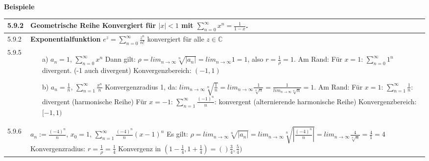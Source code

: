     \noindent
    \textbf{Beispiele}
    \begin{table}[H]
    \begin{tabularx}{\textwidth}{X m{16cm}}
        \toprule

        5.9.2 & \textbf{Geometrische Reihe} \hfill \break 
                Konvergiert für $|x| < 1$ mit $\sum^{\infty}_{n=0} x^n = \frac{1}{1-x}$. \\
        \midrule
        5.9.2 & \textbf{Exponentialfunktion} \hfill \break
                $e^z = \sum^{\infty}_{n=0} \frac{z^n}{n!}$ konvergiert für alle $z \in \mathbb{C}$ \\ 
        \midrule
        5.9.5 & \begin{itemize}[topsep=-0.5cm]
                    \item[a)] $a_n = 1$, $\sum^{\infty}_{n=0} x^n$ \hfill \break
                                Dann gilt: $\rho = lim_{n \rightarrow \infty} \sqrt[n]{|a_n|} = lim_{n \rightarrow \infty} 1 = 1$, also $r = \frac{1}{\rho} = 1$. \hfill \break
                                Am Rand: Für $x=1$: $\sum^{\infty}_{n=0} 1^n$ divergent. (-1 auch divergent) \hfill \break
                                Konvergenzbereich: $(-1,1)$
                    \item[b)] $a_n = \frac{1}{n}$, $\sum^{\infty}_{n=1} \frac{x^n}{n}$ \hfill \break
                                Konvergenzradius 1, da: $lim_{n \rightarrow \infty} \sqrt[n]{\frac{1}{n}} = lim_{n \rightarrow \infty} \frac{1}{\sqrt[n]{n}}
                                = \frac{1}{lim_{n \rightarrow \infty} \sqrt[n]{n}} = 1$. \hfill \break
                                Am Rand: Für $x=1$: $\sum^{\infty}_{n=1} \frac{1}{n}$: divergent (harmonische Reihe) \hfill \break
                                Für $x=-1$: $\sum^{\infty}_{n=1} \frac{(-1)^n}{n}$: konvergent (alternierende harmonische Reihe) \hfill \break
                                Konvergenzbereich: $[-1,1)$
                \end{itemize} \vspace{-0cm} \\
        \midrule
        5.9.6 & $a_n := \frac{(-4)^n}{n}$, $x_0 = 1$, $\sum^{\infty}_{n=1} \frac{(-4)^n}{n}(x-1)^n$ \hfill \break
                Es gilt: $\rho = lim_{n \rightarrow \infty} \sqrt[n]{|a_n|} = lim_{n \rightarrow \infty} \sqrt[n]{|\frac{(-4)^n}{n}|} =
                lim_{n \rightarrow \infty} \frac{4}{\sqrt[n]{n}} = \frac{4}{1} = 4$ \hfill \break 
                Konvergenzradius: $r = \frac{1}{\rho} = \frac{1}{4}$ \hfill \break
                Konvergenz in $(1- \frac{1}{4}, 1 + \frac{1}{4}) = ()\frac{3}{4}, \frac{5}{4})$ \hfill \break

\end{tabularx}
\end{table}
